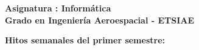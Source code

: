 \documentclass[12pt,spanish]{article}
\begin{document}
\begin{center}
	{\bf Asignatura : Informática}                                               
	\\
	{\bf Grado en Ingeniería Aeroespacial - ETSIAE}                                            \\

\end{center}

\vspace{1cm}

\noindent
{\bf \Large Hitos semanales del primer semestre: 
}                                                                               
     \\

\vspace{0.5cm}
\end{document}
